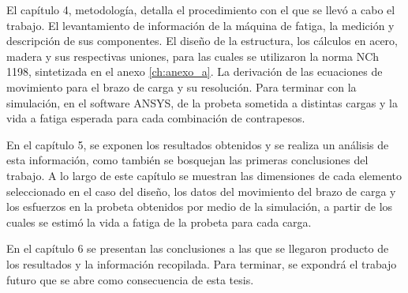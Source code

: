 El capítulo 4, metodología, detalla el procedimiento con el que se llevó a cabo el trabajo. El levantamiento de información de la máquina de fatiga, la medición y descripción de sus componentes. El diseño de la estructura, los cálculos en acero, madera y sus respectivas uniones, para las cuales se utilizaron la norma NCh 1198, sintetizada en el anexo \ref{ch:anexo_a}. La derivación de las ecuaciones de movimiento para el brazo de carga y su resolución. Para terminar con la simulación, en el software ANSYS, de la probeta sometida a distintas cargas y la vida a fatiga esperada para cada combinación de contrapesos.

En el capítulo 5, se exponen los resultados obtenidos y se realiza un análisis de esta información, como también se bosquejan las primeras conclusiones del trabajo. A lo largo de este capítulo se muestran las dimensiones de cada elemento seleccionado en el caso del diseño, los datos del movimiento del brazo de carga y los esfuerzos en la probeta obtenidos por medio de la simulación, a partir de los cuales se estimó la vida a fatiga de la probeta para cada carga.

En el capítulo 6 se presentan las conclusiones a las que se llegaron producto de los resultados y la información recopilada. Para terminar, se expondrá el trabajo futuro que se abre como consecuencia de esta tesis.




